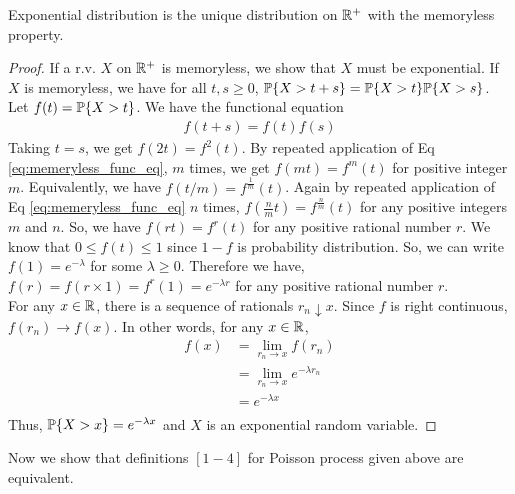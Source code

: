 \documentclass[all-lectures.tex]{subfiles}
\begin{document}
\begin{thm}[] 
Exponential distribution is the unique distribution on $\R^+$ with the memoryless property.
\begin{proof}
If a r.v. $X$ on $\R^+$ is memoryless, we show that $X$ must be exponential. If $X$ is memoryless, we have for all $t,s\geq 0$, $\P\{X>t+s\} = \P\{X>t\} \P\{X>s\}$. Let $f(t) = \P\{X>t\}$. We have the functional equation
\begin{align}
\label{eq:memeryless_func_eq}
f(t+s) = f(t) f(s)
\end{align}
Taking $t=s$, we get $f(2t) = f^2(t)$. By repeated application of Eq \ref{eq:memeryless_func_eq}, $m$ times, we get $f(mt) = f^m(t)$ for positive integer $m$. Equivalently, we have $f(t/m) =f^{\frac{1}{m}}(t)$. Again by repeated application of Eq \ref{eq:memeryless_func_eq} $n$ times, $f(\frac{n}{m}t) =f^{\frac{n}{m}}(t)$ for any positive integers $m$ and $n$. So, we have $f(rt) = f^r(t)$ for any positive rational number $r$. We know that $0\leq f(t) \leq 1$ since $1-f$ is probability distribution. So, we can write $f(1) = e^{-\lambda}$ for some $\lambda \geq 0$. Therefore we have, $f(r) = f(r \times 1) = f^r(1) = e^{-\lambda r}$ for any positive rational number $r$. \\
\indent For any $x \in \R$, there is a sequence of rationals $r_n \downarrow x$. Since $f$ is right continuous, $f(r_n) \rightarrow f(x)$. In other words, for any $x \in \R$,
\begin{align*}
f(x) &= \lim_{r_n \rightarrow x} f(r_n) \\
 &= \lim_{r_n \rightarrow x} e^{-\lambda r_n} \\
 &= e^{-\lambda x} \\ 
\end{align*}
Thus, $\P\{X>x\} = e^{-\lambda x}$ and $X$ is an exponential random variable.
\end{proof}
\end{thm}

Now we show that definitions $[1-4]$ for Poisson process given above are equivalent. 
\end{document}
